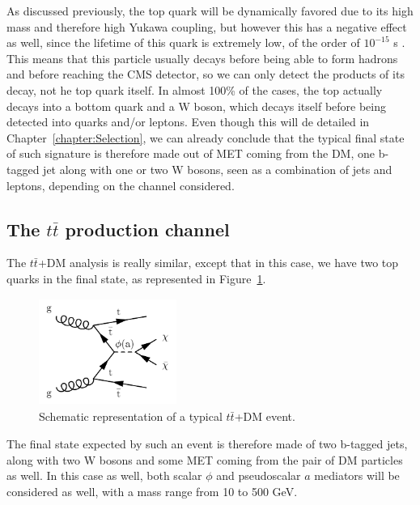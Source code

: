 \documentclass[a4paper, 10pt, openright]{report}
\begin{document}
As discussed previously, the top quark will be dynamically favored due to its high mass and therefore high Yukawa coupling, but however this has a negative effect as well, since the lifetime of this quark is extremely low, of the order of $10^{-15}$ s \cite{PDG}. This means that this particle usually decays before being able to form hadrons and before reaching the \ac{CMS} detector, so we can only detect the products of its decay, not he top quark itself. In almost 100\% of the cases, the top actually decays into a bottom quark and a W boson, which decays itself before being detected into quarks and/or leptons. Even though this will de detailed in Chapter~\ref{chapter:Selection}, we can already conclude that the typical final state of such signature is therefore made out of \ac{MET} coming from the \ac{DM}, one b-tagged jet along with one or two W bosons, seen as a combination of jets and leptons, depending on the channel considered.

\subsection{The $t \bar t$ production channel} \label{subsection:ttChannel}

The $t \bar t$+DM analysis is really similar, except that in this case, we have two top quarks in the final state, as represented in Figure~\ref{fig:ttDMFeynman}.

\begin{figure}[htbp]
\begin{center}
\includegraphics[width=4.5cm, height=3.5cm]{figs/ttDM.png}
\caption{Schematic representation of a typical $t \bar t$+DM event.}
\label{fig:ttDMFeynman}
\end{center}
\end{figure}

The final state expected by such an event is therefore made of two b-tagged jets, along with two W bosons and some \ac{MET} coming from the pair of \ac{DM} particles as well. In this case as well, both scalar $\phi$ and pseudoscalar $a$ mediators will be considered as well, with a mass range from 10 to 500 GeV.
\end{document}
